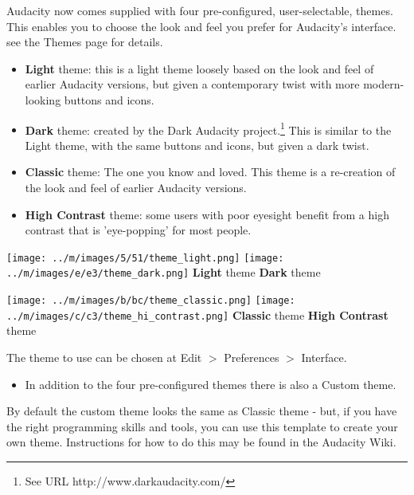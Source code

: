 Audacity now comes supplied with four pre-configured, user-selectable, themes.  This enables you to choose the look and feel you prefer for Audacity's interface. see the Themes page for details.
\begin{itemize}
\item \textbf{Light} theme: this is a light theme loosely based on the look and feel of earlier Audacity versions, but given a contemporary twist with more modern-looking buttons and icons. 
\item \textbf{Dark} theme: created by the Dark Audacity project.\footnote{See URL http://www.darkaudacity.com/} This is similar to the Light theme, with the same buttons and icons, but given a dark twist.
\item \textbf{Classic} theme: The one you know and loved. This theme is a re-creation of the look and feel of earlier Audacity versions. 
\item \textbf{High Contrast} theme: some users with poor eyesight benefit from a high contrast that is 'eye-popping' for most people.
\end{itemize}



\* \* \* \* \texttt{[image: ../m/images/5/51/theme\_light.png]}
\* \* \* \* \texttt{[image: ../m/images/e/e3/theme\_dark.png]}
\* \* \* \* 
\textbf{Light} theme
\* \* \* \* 
\textbf{Dark} theme


\* \* \* \* \texttt{[image: ../m/images/b/bc/theme\_classic.png]}
\* \* \* \* \texttt{[image: ../m/images/c/c3/theme\_hi\_contrast.png]}
\* \* \* \* 
\textbf{Classic} theme
\* \* \* \* 
\textbf{High Contrast} theme



The theme to use can be chosen at Edit \mbox{$>$} Preferences \mbox{$>$} Interface.  
\begin{itemize}
\item  In addition to the four pre-configured themes there is also a Custom theme.  
\end{itemize}
 By default the custom theme looks the same as Classic theme - but, if you have the right programming skills and tools, you can use this template to create your own theme.  Instructions for how to do this may be found in the Audacity Wiki.


